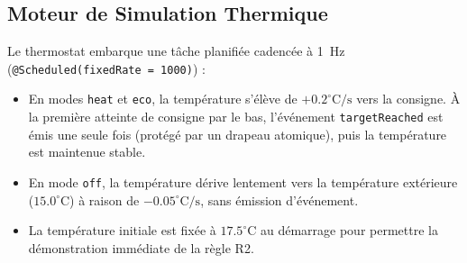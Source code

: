 \documentclass[10pt,a4paper]{article}
\begin{document}
\subsection{Moteur de Simulation Thermique}
Le thermostat embarque une tâche planifiée cadencée à 1~Hz (\texttt{@Scheduled(fixedRate = 1000)}) :
\begin{itemize}
  \item En modes \texttt{heat} et \texttt{eco}, la température s'élève de $+0.2^\circ\text{C/s}$ vers la consigne. À la première atteinte de consigne par le bas, l'événement \texttt{targetReached} est émis une seule fois (protégé par un drapeau atomique), puis la température est maintenue stable.
  \item En mode \texttt{off}, la température dérive lentement vers la température extérieure ($15.0^\circ\text{C}$) à raison de $-0.05^\circ\text{C/s}$, sans émission d'événement.
  \item La température initiale est fixée à $17.5^\circ\text{C}$ au démarrage pour permettre la démonstration immédiate de la règle R2.
\end{itemize}
\end{document}

